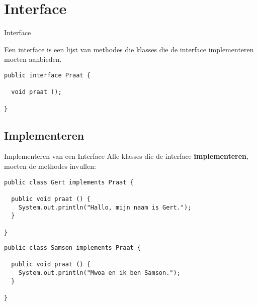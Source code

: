 \documentclass[handout]{beamer}
\theoremstyle{remark}
\newcommand{\term}[1]{\textbf{#1}}
\begin{document}
\section{Interface}
\begin{frame}[fragile]{Interface}
\begin{definition}[Interface]
Een interface is een lijst van methodes die klasses die de interface implementeren moeten aanbieden.
\end{definition}
\begin{example}
\begin{lstlisting}
public interface Praat {

  void praat ();

}
\end{lstlisting}
\end{example}
\end{frame}
\subsection{Implementeren}
\begin{frame}[fragile]{Implementeren van een Interface}
Alle klasses die de interface \term{implementeren}, moeten de methodes invullen:
\begin{example}
\begin{lstlisting}
public class Gert implements Praat {

  public void praat () {
    System.out.println("Hallo, mijn naam is Gert.");
  }

}
\end{lstlisting}
\end{example}
\begin{example}
\small{\begin{lstlisting}
public class Samson implements Praat {

  public void praat () {
    System.out.println("Mwoa en ik ben Samson.");
  }

}
\end{lstlisting}}
\end{example}
\end{frame}
\end{document}
